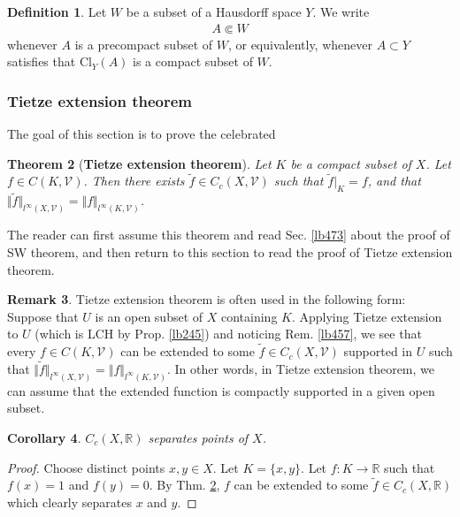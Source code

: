 \documentclass[12pt,b5paper,notitlepage]{article}
\theoremstyle{definition}
\newtheorem{df}{Definition}[section]
\newtheorem{rem}[df]{Remark}
\theoremstyle{plain}
\newtheorem{thm}[df]{Theorem}
\newtheorem{co}[df]{Corollary}
\newcommand{\mc}{\mathcal}
\newcommand{\wtd}{\widetilde}
\newcommand{\Rbb}{\mathbb R}
\newcommand{\Cl}{\mathrm{Cl}}
\numberwithin{equation}{section}
\begin{document}
\begin{df}
Let $W$ be a subset of a Hausdorff space $Y$. We write 
\begin{align}
A\Subset W
\end{align}
whenever $A$ is a precompact subset of $W$, or equivalently, whenever $A\subset Y$ satisfies that $\Cl_Y(A)$ is a compact subset of $W$.
\end{df}




\subsubsection{Tietze extension theorem}



The goal of this section is to prove the celebrated

\begin{thm}[\textbf{Tietze extension theorem}]\label{lb468}
Let $K$ be a compact subset of $X$. Let $f\in C(K,\mc V)$. Then there exists $\wtd f\in C_c(X,\mc V)$ such that $\wtd f|_K=f$, and that $\Vert \wtd f\Vert_{l^\infty(X,\mc V)}=\Vert f\Vert_{l^\infty(K,\mc V)}$.
\end{thm}

The reader can first assume this theorem and read Sec. \ref{lb473} about the proof of SW theorem, and then return to this section to read the proof of Tietze extension theorem.

\begin{rem}
Tietze extension theorem is often used in the following form: Suppose that $U$ is an open subset of $X$ containing $K$. Applying Tietze extension to $U$ (which is LCH by Prop. \ref{lb245}) and noticing Rem. \ref{lb457}, we see that every $f\in C(K,\mc V)$ can be extended to some $\wtd f\in C_c(X,\mc V)$ supported in $U$ such that $\Vert \wtd f\Vert_{l^\infty(X,\mc V)}=\Vert f\Vert_{l^\infty(K,\mc V)}$. In other words, in Tietze extension theorem, we can assume that the extended function is compactly supported in a given open subset.
\end{rem}

\begin{co}\label{lb474}
$C_c(X,\Rbb)$ separates points of $X$.
\end{co}

\begin{proof}
Choose distinct points $x,y\in X$. Let $K=\{x,y\}$. Let $f:K\rightarrow\Rbb$ such that $f(x)=1$ and $f(y)=0$. By Thm. \ref{lb468}, $f$ can be extended to some $\wtd f\in C_c(X,\Rbb)$ which clearly separates $x$ and $y$.
\end{proof}
\end{document}
